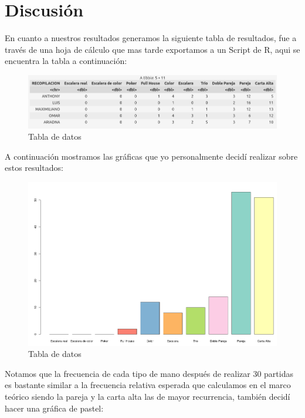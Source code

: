\documentclass[letterpaper,11pt,dvipsnames]{article}
\begin{document}
\section{Discusión}
En cuanto a nuestros resultados generamos la siguiente tabla de resultados, fue a través de una hoja de cálculo que mas tarde exportamos a un Script de R, aqui se encuentra la tabla a continuación:
\begin{figure}[H]
    \centering
    \includegraphics[scale=0.485]{tabla.png}
    \caption{Tabla de datos}
    \label{fig:hipocicloide}
\end{figure}
A continuación mostramos las gráficas que yo personalmente decidí realizar sobre estos resultados:
\begin{figure}[H]
    \centering
    \includegraphics[scale=0.485]{barras.png}
    \caption{Tabla de datos}
    \label{fig:hipocicloide}
\end{figure}
Notamos que la frecuencia de cada tipo de mano después de realizar 30 partidas es bastante similar a la frecuencia relativa esperada que calculamos en el marco teórico siendo la pareja y la carta alta las de mayor recurrencia, también decidí hacer una gráfica de pastel:
\end{document}
